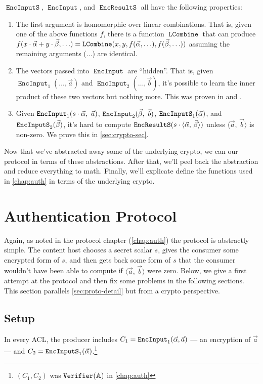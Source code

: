 \documentclass[pdftex,12pt,a4papaer,twoside,notitlepage]{report}
\newcommand{\iprod}[2]{\langle #1,\,#2\rangle}
\DeclareMathOperator{\ein}{\mathtt{EncInput}}
\DeclareMathOperator{\combine}{\mathtt{LCombine}}
\DeclareMathOperator{\eins}{\mathtt{EncInputS}}
\DeclareMathOperator{\eouts}{\mathtt{EncResultS}}
\begin{document}
$\eins$, $\ein$, and $\eouts$ all have the following properties: 
\begin{enumerate}
\item The first argument is homomorphic over linear combinations. That is, given
  one of the above functions $f$, there is a function $\combine$ that can
  produce $f(x\cdot \Ap + y\cdot \Bp, \ldots) = \combine(x, y, f(\Ap,
  \ldots),f(\Bp, \ldots))$ assuming the remaining arguments
  ($\ldots$) are identical.
\item The vectors passed into $\ein$ are ``hidden''. That is, given
  $\ein_1(\ldots, \vec{a})$ and $\ein_2(\ldots, \vec{b})$, it's possible to
  learn the inner product of these two vectors but nothing more. This was proven
  in \cite{inner-product} and \cite{inner-product-ext}.
\item \sloppy Given $\ein_1({s\cdot\Ap},~\vec{a})$, $\ein_2(\Bp,~\vec{b})$,
  $\eins_1(\Ap)$, and $\eins_2(\Bp)$, it's hard to compute $\eouts({s\cdot\ABp})$
  unless $\iprod{\vec{a}}{\vec{b}}$ is non-zero. We prove this in
  \cref{sec:crypto-sec}.
\end{enumerate}

Now that we've abstracted away some of the underlying crypto, we can our
protocol in terms of these abstractions. After that, we'll peel back the
abstraction and reduce everything to math. Finally, we'll explicate define the
functions used in \cref{chap:auth} in terms of the underlying crypto.

\section{Authentication Protocol}

Again, as noted in the protocol chapter (\cref{chap:auth}) the protocol is
abstractly simple. The content host chooses a secret scalar $s$, gives the
consumer some encrypted form of $s$, and then gets back some form of $s$ that
the consumer wouldn't have been able to compute if $\iprod{\vec{a}}{\vec{b}}$
were zero. Below, we give a first attempt at the protocol and then fix some
problems in the following sections. This section parallels
\cref{sec:proto-detail} but from a crypto perspective.

\subsection{Setup}

In every ACL, the producer includes $C_1 = \ein_1(\Ap, \vec{a})$ --- an
encryption of $\vec{a}$ --- and $C_2 = \eins_1(\Ap)$.\footnote{$(C_1, C_2)$ was
  $\operatorname{\mathtt{Verifier}}(\mathbb{A})$ in \cref{chap:auth}}
\end{document}
